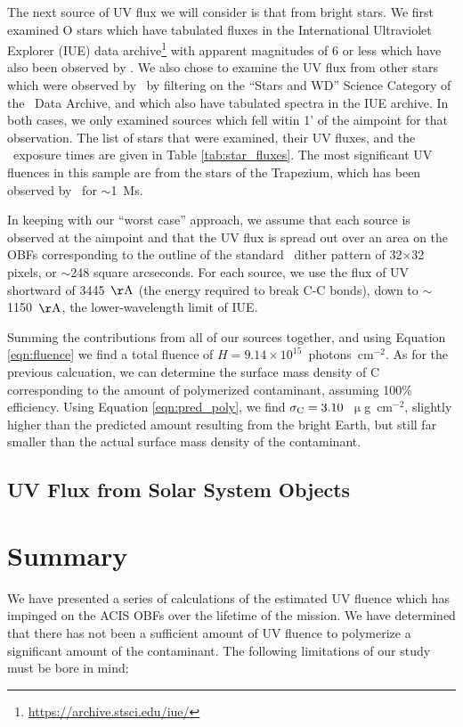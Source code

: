 \documentclass[11pt]{article}
\begin{document}
The next source of UV flux we will consider is that from bright stars. We first examined O stars which have tabulated fluxes in the International Ultraviolet Explorer (IUE) data archive\footnote{\url{https://archive.stsci.edu/iue/}} with apparent magnitudes of 6 or less which have also been observed by \chandra. We also chose to examine the UV flux from other stars which were observed by \chandra~by filtering on the ``Stars and WD'' Science Category of the \chandra~Data Archive, and which also have tabulated spectra in the IUE archive. In both cases, we only examined sources which fell witin 1' of the aimpoint for that observation. The list of stars that were examined, their UV fluxes, and the \chandra~exposure times are given in Table \ref{tab:star_fluxes}. The most significant UV fluences in this sample are from the stars of the Trapezium, which has been observed by \chandra~for $\sim$1~Ms.



In keeping with our ``worst case'' approach, we assume that each source is observed at the aimpoint and that the UV flux is spread out over an area on the OBFs corresponding to the outline of the standard \chandra~dither pattern of 32$\times$32 pixels, or $\sim$248 square arcseconds. For each source, we use the flux of UV shortward of 3445~${\rm \AA}$ (the energy required to break C-C bonds), down to $\sim$1150~${\rm \AA}$, the lower-wavelength limit of IUE.

Summing the contributions from all of our sources together, and using Equation \ref{eqn:fluence} we find a total fluence of $H = 9.14 \times 10^{15}$~photons~cm$^{-2}$. As for the previous calcuation, we can determine the surface mass density of C corresponding to the amount of polymerized contaminant, assuming 100\% efficiency. Using Equation \ref{eqn:pred_poly}, we find $\sigma_{\rm C} = 3.10$~$\upmu$g~cm$^{-2}$, slightly higher than the predicted amount resulting from the bright Earth, but still far smaller than the actual surface mass density of the contaminant.

\subsection{UV Flux from Solar System Objects}

\section{Summary}

We have presented a series of calculations of the estimated UV fluence which has impinged on the ACIS OBFs
over the lifetime of the mission. We have determined that there has not been a sufficient amount of UV fluence
to polymerize a significant amount of the contaminant. The following limitations of our study must be bore in mind:
\end{document}
